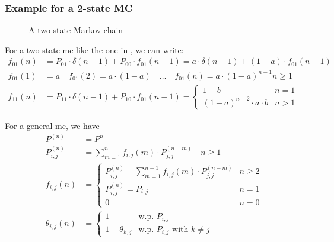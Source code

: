 \subsubsection{Example for a 2-state MC}
\begin{figure}
	\centering
	\caption{A two-state Markov chain}
	\label{fig:2sMC}
\end{figure}
For a two state \gls{mc} like the one in , we can write:
\begin{equation}\begin{split}
	f_{01}(n)&= P_{01} \cdot \delta(n-1) + P_{00} \cdot f_{01}(n-1) = a \cdot \delta(n-1) + (1-a)\cdot f_{01}(n-1)\\
	f_{01}(1)&=a \quad f_{01}(2)=a \cdot(1-a) \quad \dots \quad f_{01}(n) = a\cdot(1-a)^{n-1} n \ge 1 \\
	f_{11}(n) &= P_{11}\cdot \delta(n-1) + P_{10} \cdot f_{01}(n-1) =
	\begin{cases}
		1-b & n=1 \\ (1-a)^{n-2}\cdot a \cdot b & n>1
	\end{cases}
\end{split}\end{equation}

For a general \gls{mc}, we have
\begin{equation}\begin{split}
	P^{(n)} &= P^n \\
	P_{i,j}^{(n)} &= \sum\limits_{m=1}^n f_{i,j}(m) \cdot P_{j,j}^{(n-m)} \quad n \ge 1 \\
	f_{i,j}(n)&=
	\begin{cases}
		P_{i,j}^{(n)} -\sum\limits_{m=1}^{n-1} f_{i,j}(m) \cdot P_{j,j}^{(n-m)} & n \ge 2 \\
		P_{i,j}^{(n)} = P_{i,j} & n =1 \\
		0 & n=0
	\end{cases} \\
	\theta_{i,j}(n)&=
	\begin{cases}
		1 & \text{w.p. } P_{i,j} \\
		1+\theta_{k,j} &  \text{w.p. } P_{i,j} \text{ with } k \neq j
	\end{cases} \\
\end{split}\end{equation}

